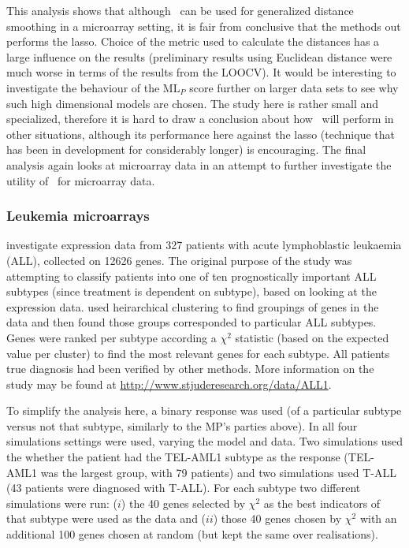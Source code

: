 This analysis shows that although \mdsds\ can be used for generalized distance smoothing in a microarray setting, it is fair from conclusive that the methods out performs the lasso. Choice of the metric used to calculate the distances has a large influence on the results (preliminary results using Euclidean distance were much worse in terms of the results from the LOOCV). It would be interesting to investigate the behaviour of the $\text{ML}_P$ score further on larger data sets to see why such high dimensional models are chosen. The study here is rather small and specialized, therefore it is hard to draw a conclusion about how \mdsds\ will perform in other situations, although its performance here against the lasso (technique that has been in development for considerably longer) is encouraging. The final analysis again looks at microarray data in an attempt to further investigate the utility of \mdsds\ for microarray data.

\subsubsection{Leukemia microarrays}

 investigate expression data from 327 patients with acute lymphoblastic leukaemia (ALL), collected on 12626 genes. The original purpose of the study was attempting to classify patients into one of ten prognostically important ALL subtypes (since treatment is dependent on subtype), based on looking at the expression data.  used heirarchical clustering to find groupings of genes in the data and then found those groups corresponded to particular ALL subtypes. Genes were ranked per subtype according a $\chi^2$ statistic (based on the expected value per cluster) to find the most relevant genes for each subtype. All patients true diagnosis had been verified by other methods. More information on the study may be found at \url{http://www.stjuderesearch.org/data/ALL1}.

To simplify the analysis here, a binary response was used (of a particular subtype versus not that subtype, similarly to the MP's parties above). In all four simulations settings were used, varying the model and data. Two simulations used the whether the patient had the TEL-AML1 subtype as the response (TEL-AML1 was the largest group, with 79 patients) and two simulations used T-ALL (43 patients were diagnosed with T-ALL). For each subtype two different simulations were run: ($i$) the 40 genes selected by $\chi^2$ as the best indicators of that subtype were used as the data and ($ii$) those 40 genes chosen by $\chi^2$ with an additional 100 genes chosen at random (but kept the same over realisations). 

